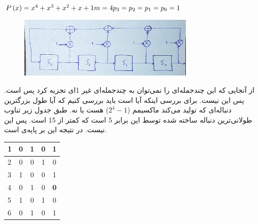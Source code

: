 \documentclass{article}
\begin{document}
\subsubsection{}
\begin{latin}
$
P\left( x \right) = x ^ 4 + x ^ 3 + x ^ 2 + x + 1\\
m = 4\\
p_3 = p_2 = p_1 = p_0 = 1
$
\end{latin}
\begin{figure}[H]
    \centering
    \includegraphics[width=0.75\textwidth]{figures/1.jpg}
    \caption
	{}
    \label{fig:fig1}
\end{figure}
از آنجایی که این چندجمله‌ای را نمی‌توان به چندجمله‌ای غیر 1ای تجزیه کرد پس  است. پس این   نیست. برای بررسی اینکه آیا  است باید بررسی کنیم که آیا طول بزرگترین دنباله‌ای که تولید می‌کند ماکسیمم ($2^4 - 1$) هست یا نه. طبق جدول زیر تناوب طولانی‌ترین دنباله ساخته شده توسط این  برابر 5 است که کمتر از 15 است. پس این   نیست. در نتیجه این   بر پایه‌ی  است.
\begin{latin}
\begin{longtable}[c]{l|c|c|c|c|}
\cline{2-5}
1 & 0 & 1 & 0 & 1          \\ \cline{2-5} 
\endfirsthead
%
\endhead
%
2 & 0 & 0 & 1 & 0          \\ \cline{2-5} 
3 & 1 & 0 & 0 & 1          \\ \cline{2-5} 
4 & 0 & 1 & 0 & \textbf{0} \\ \cline{2-5} 
5 & 1 & 0 & 1 & 0          \\ \cline{2-5} 
6 & 0 & 1 & 0 & 1          \\ \cline{2-5} 
\end{longtable}
\end{latin}
\end{document}
